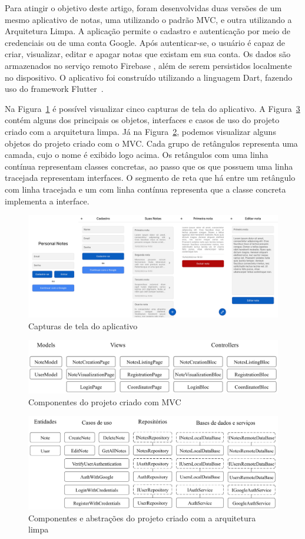 Para atingir o objetivo deste artigo, foram desenvolvidas duas versões de um mesmo aplicativo de notas, uma utilizando o padrão MVC, e outra utilizando a Arquitetura Limpa.
A aplicação permite o cadastro e autenticação por meio de credenciais ou de uma conta Google.
Após autenticar-se, o usuário é capaz de criar, visualizar, editar e apagar notas que existam em sua conta.
Os dados são armazenados no serviço remoto Firebase \cite{firebase}, além de serem persistidos localmente no dispositivo.
O aplicativo foi construído utilizando a linguagem Dart, fazendo uso do framework Flutter~\cite{flutter}.

Na Figura~\ref{fig:screenshots} é possível visualizar cinco capturas de tela do aplicativo.
A Figura~\ref{fig:project_clean_arch} contém alguns dos principais os objetos, interfaces e casos de uso do projeto criado com a arquitetura limpa.
Já na Figura~\ref{fig:project_mvc}, podemos visualizar alguns objetos do projeto criado com o MVC.
Cada grupo de retângulos representa uma camada, cujo o nome é exibido logo acima. 
Os retângulos com uma linha contínua representam classes concretas, ao passo que os que possuem uma linha tracejada representam interfaces.
O segmento de reta que há entre um retângulo com linha tracejada e um com linha contínua representa que a classe concreta implementa a interface.
\begin{figure}[ht]
	\centering
	\includegraphics[width=1\textwidth]{images/screenshots.png}
	\caption{Capturas de tela do aplicativo}
	\label{fig:screenshots}
\end{figure}

\begin{figure}[ht]
	\centering
	\includegraphics[width=1\textwidth]{images/project_mvc.png}
	\caption{Componentes do projeto criado com MVC}
	\label{fig:project_mvc}
\end{figure}

\begin{figure}[ht]
	\centering
	\includegraphics[width=1\textwidth]{images/project_clean_arch.png}
	\caption{Componentes e abstrações do projeto criado com a arquitetura limpa}
	\label{fig:project_clean_arch}
\end{figure}

\clearpage

